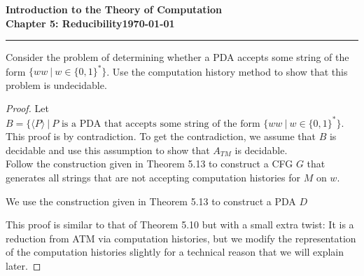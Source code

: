 \documentclass[11pt]{article}
\newcommand{\dated}{\today}
\begin{document}
\textbf{Introduction to the Theory of
Computation}\hfill\textbf{\myname}\\[0.01in]
\textbf{Chapter 5: Reducibility}\hfill\textbf{\dated}\\
\smallskip\hrule\bigskip

\begin{problem}{5.33}
Consider the problem of determining whether a PDA accepts some string of the
form $\{ww \ | \ w \in \{0,1\}^{*}\}$. Use the computation history method to show that this problem is undecidable.
\end{problem}

\begin{proof}
Let $B = \{\langle P \rangle \ | \ P \text{ is a PDA that accepts some string of the form } \{ww \ | \ w \in \{0,1\}^{*}\}$. This proof is by contradiction. To get the contradiction, we assume that $B$ is decidable and use this assumption to show that $A_{TM}$ is decidable. \\

Follow the construction given in Theorem 5.13 to construct a CFG $G$ that generates all strings that are not accepting computation histories for $M$ on $w$.



We use the construction given in Theorem 5.13 to construct a PDA $D$

This proof is similar to that of Theorem 5.10 but with a small extra twist: It is a
reduction from ATM via computation histories, but we modify the representation
of the computation histories slightly for a technical reason that we will explain
later.
\end{proof}
\end{document}
